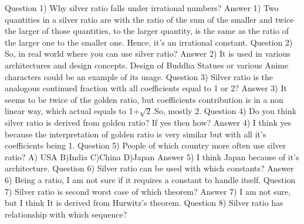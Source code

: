 \documentclass[12pt]{article}
\begin{document}
{Question 1) Why silver ratio falls under irrational numbers?
\newline
Answer 1) Two quantities in a silver ratio are with the ratio of the sum of the smaller and twice the larger of those quantities, to the larger quantity, is the same as the ratio of the larger one to the smaller one. Hence, it’s an irrational constant.    
\newline
\newline
Question 2) So, in real world where you can use silver ratio?
\newline
Answer 2) It is used in various architectures and design concepts. Design of Buddha Statues or various Anime characters could be an example of its usage.
\newline
\newline
Question 3) Silver ratio is the analogous continued fraction with all coefficients equal to 1 or 2?
\newline
Answer 3) It seems to be twice of the golden ratio, but coefficients contribution is in a non linear way, which actual equals to 1+$\sqrt{2}$.So, mostly 2.
\newline
\newline
Question 4) Do you think silver ratio is derived from golden ratio? If yes then how?
\newline
Answer 4) I think yes because the interpretation of golden ratio is very similar but with all it’s coefficients being 1.
\newline
\newline
Question 5) People of which country more often use silver ratio?
\newline
A) USA  B)India  C)China    D)Japan
\newline
Answer 5) I think Japan because of it’s architecture.
\newline
\newline
Question 6) Silver ratio can be used with which constants?
\newline
Answer 6) Being a ratio, I am not sure if it requires a constant to handle itself.
\newline
\newline
Question 7) Silver ratio is second worst case of which theorem?
\newline
Answer 7) I am not sure, but I think It is derived from Hurwitz’s theorem.
\newline
\newline
Question 8) Silver ratio has relationship with which sequence?
\newline
}
\end{document}
